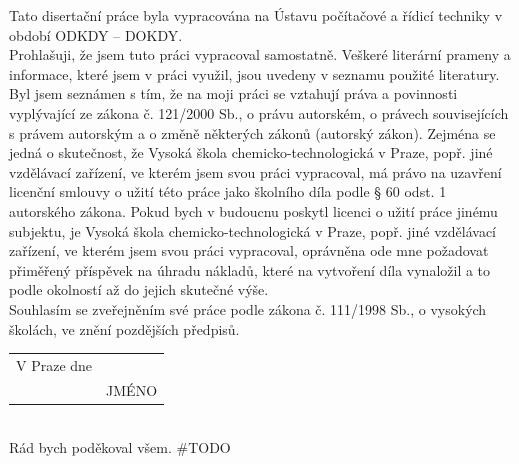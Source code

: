 
\clearpage
\thispagestyle{empty} 
 \vspace*{1cm}
 \noindent 
 Tato disertační práce byla vypracována na Ústavu počítačové a řídicí techniky
v období ODKDY -- DOKDY. \\ [30mm]
Prohlašuji, že jsem tuto práci vypracoval samostatně. Veškeré literární prameny
a informace, které jsem v práci využil, jsou uvedeny v seznamu použité literatury. \\ [8mm]
Byl jsem seznámen s tím, že na moji práci se vztahují práva a povinnosti vyplývající
ze zákona č. 121/2000 Sb., o právu autorském, o právech souvisejících s právem
autorským a o změně některých zákonů (autorský zákon). Zejména se jedná
o skutečnost, že Vysoká škola chemicko-technologická v Praze, popř. jiné vzdělávací
zařízení, ve kterém jsem svou práci vypracoval, má právo na uzavření licenční
smlouvy o užití této práce jako školního díla podle § 60 odst. 1 autorského zákona.
Pokud bych v budoucnu poskytl licenci o užití práce jinému subjektu, je Vysoká
škola chemicko-technologická v Praze, popř. jiné vzdělávací zařízení, ve kterém
jsem svou práci vypracoval, oprávněna ode mne požadovat přiměřený příspěvek
na úhradu nákladů, které na vytvoření díla vynaložil a to podle okolností až do
jejich skutečné výše. \\ [8mm]
\noindent
Souhlasím se zveřejněním své práce podle zákona č. 111/1998 Sb., o vysokých
školách, ve znění pozdějších předpisů. \\ [30mm]


\noindent\begin{tabular}{@{}p{2.5in}p{}@{}}
\hspace{1cm} V Praze dne                      &\hspace{2cm} \dotfill\\
             & \multicolumn{1}{c}{\hphantom{hhhhHHHHH}JMÉNO}\\
\end{tabular} 

 
\cleardoublepage
\thispagestyle{empty}

 \vspace*{\fill}
  \\ [5mm]
Rád bych poděkoval všem. \#TODO

